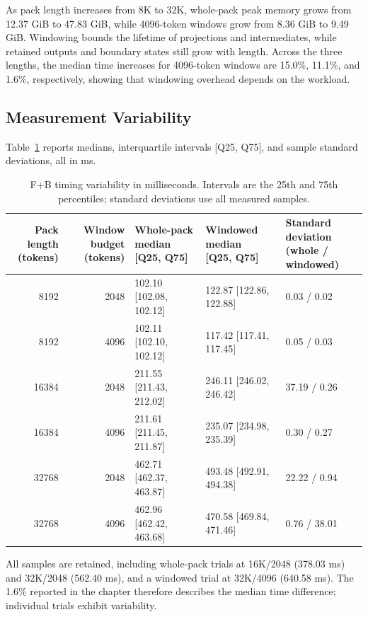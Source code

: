 As pack length increases from 8K to 32K, whole-pack peak memory grows from 12.37 GiB to 47.83 GiB, while 4096-token windows grow from 8.36 GiB to 9.49 GiB.
Windowing bounds the lifetime of projections and intermediates, while retained outputs and boundary states still grow with length.
Across the three lengths, the median time increases for 4096-token windows are 15.0\%, 11.1\%, and 1.6\%, respectively, showing that windowing overhead depends on the workload.

\subsection{Measurement Variability}

Table~\ref{tab:infra_window_variability} reports medians, interquartile intervals [Q25, Q75], and sample standard deviations, all in ms.

\begin{table}[htbp]
    \centering
    \caption{F+B timing variability in milliseconds.
    Intervals are the 25th and 75th percentiles; standard deviations use all measured samples.}
    \label{tab:infra_window_variability}
    \small
    \setlength{\tabcolsep}{4pt}
    \renewcommand{\arraystretch}{1.12}
    \begin{tabular}{rrlll}
        \toprule
        \makecell{Pack length\\(tokens)} & \makecell{Window budget\\(tokens)} & \makecell[l]{Whole-pack median\\{[Q25, Q75]}} & \makecell[l]{Windowed median\\{[Q25, Q75]}} & \makecell[l]{Standard deviation\\(whole / windowed)} \\
        \midrule
        8192 & 2048 & 102.10 [102.08, 102.12] & 122.87 [122.86, 122.88] & 0.03 / 0.02 \\
        8192 & 4096 & 102.11 [102.10, 102.12] & 117.42 [117.41, 117.45] & 0.05 / 0.03 \\
        16384 & 2048 & 211.55 [211.43, 212.02] & 246.11 [246.02, 246.42] & 37.19 / 0.26 \\
        16384 & 4096 & 211.61 [211.45, 211.87] & 235.07 [234.98, 235.39] & 0.30 / 0.27 \\
        32768 & 2048 & 462.71 [462.37, 463.87] & 493.48 [492.91, 494.38] & 22.22 / 0.94 \\
        32768 & 4096 & 462.96 [462.42, 463.68] & 470.58 [469.84, 471.46] & 0.76 / 38.01 \\
        \bottomrule
    \end{tabular}
\end{table}

All samples are retained, including whole-pack trials at 16K/2048 (378.03 ms) and 32K/2048 (562.40 ms), and a windowed trial at 32K/4096 (640.58 ms).
The 1.6\% reported in the chapter therefore describes the median time difference; individual trials exhibit variability.
